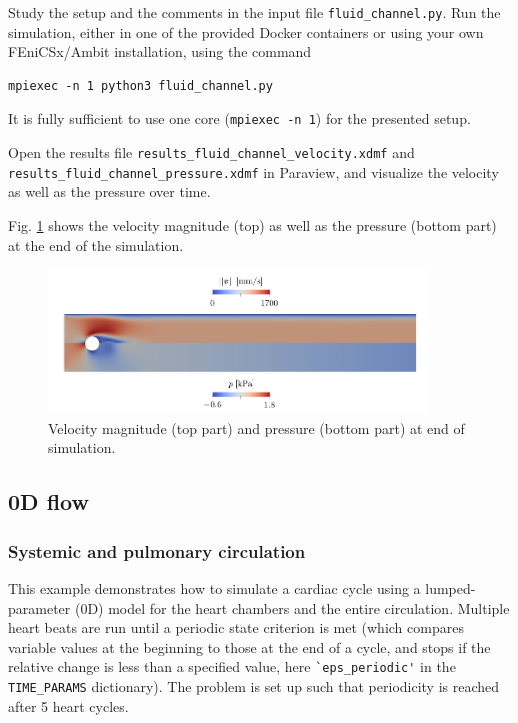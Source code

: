 \documentclass[a4paper,12pt]{report}
\begin{document}
Study the setup and the comments in the input file \verb"fluid_channel.py". Run the simulation, either in one of the provided Docker containers or using your own FEniCSx/Ambit installation, using the command

\begin{verbatim}
mpiexec -n 1 python3 fluid_channel.py
\end{verbatim}

It is fully sufficient to use one core (\verb"mpiexec -n 1") for the presented setup.

Open the results file \verb"results_fluid_channel_velocity.xdmf" and \\ \verb"results_fluid_channel_pressure.xdmf" in Paraview, and visualize the velocity as well as the pressure over time.

Fig. \ref{fig:channel_results} shows the velocity magnitude (top) as well as the pressure (bottom part) at the end of the simulation.

\begin{figure}[ht]
\centering
\includegraphics[width=0.9\textwidth]{fig/channel_results.png}
\caption{Velocity magnitude (top part) and pressure (bottom part) at end of simulation.}
\label{fig:channel_results}
\end{figure}


\subsection{0D flow}\label{subsec:demos:flow0d}

\subsubsection*{Systemic and pulmonary circulation}

This example demonstrates how to simulate a cardiac cycle using a lumped-parameter (0D) model for the heart chambers and the entire circulation. Multiple heart beats are run
until a periodic state criterion is met (which compares variable values at the beginning to those at the end of a cycle, and stops if the relative change is less than
a specified value, here \verb"`eps_periodic'" in the \verb"TIME_PARAMS" dictionary). The problem is set up such that periodicity is reached after 5 heart cycles.
\end{document}
